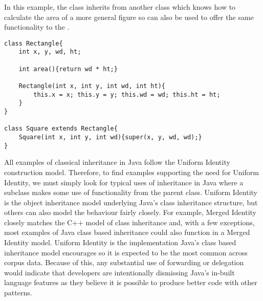 In this example, the  class inherits from another class which knows how to calculate the area of a more general figure so can also be used to offer the same functionality to the . 
\begin{lstlisting}
class Rectangle{
	int x, y, wd, ht;

	int area(){return wd * ht;}

	Rectangle(int x, int y, int wd, int ht){
		this.x = x; this.y = y; this.wd = wd; this.ht = ht;
	}
}

class Square extends Rectangle{
	Square(int x, int y, int wd){super(x, y, wd, wd);}
}
\end{lstlisting}

All examples of classical inheritance in Java follow the Uniform Identity construction model. Therefore, to find examples supporting the need for Uniform Identity, we must simply look for typical uses of inheritance in Java where a subclass makes some use of functionality from the parent class. Uniform Identity is the object inheritance model underlying Java's class inheritance structure, but others can also model the behaviour fairly closely. For example, Merged Identity closely matches the C++ model of class inheritance and, with a few exceptions, most examples of Java class based inheritance could also function in a Merged Identity model. Uniform Identity is the implementation Java's class based inheritance model encourages so it is expected to be the most common across corpus data. Because of this, any substantial use of forwarding or delegation would indicate that developers are intentionally dismissing Java's in-built language features as they believe it is possible to produce better code with other patterns.